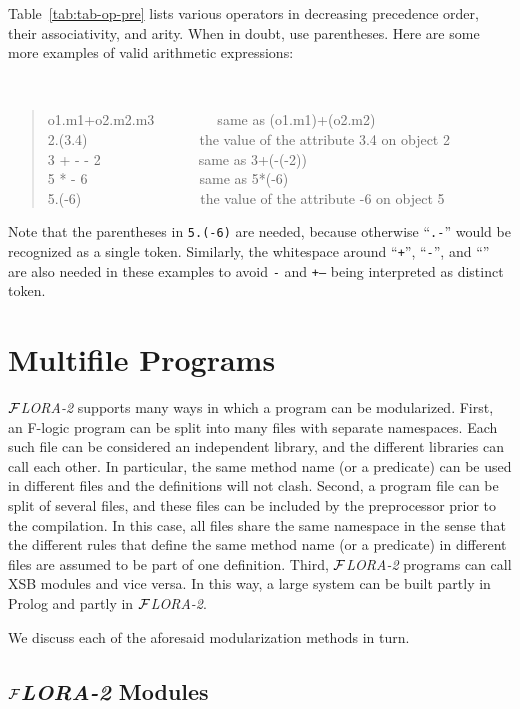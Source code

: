 \documentclass[11pt]{article}
\newcommand{\FLORA}{{\mbox{${\cal F}${\small\it LORA}\rm\emph{-2}}}\xspace}
\newcommand{\fl}{\mbox{F-logic}\xspace}
\begin{document}
Table~\ref{tab:tab-op-pre} lists various operators in decreasing precedence
order, their associativity, and arity.  When in doubt, use parentheses.
Here are some more examples of valid arithmetic expressions:
{\tt
\begin{quote}
o1.m1+o2.m2.m3~~~~~~~~~{\rm same as} (o1.m1)+(o2.m2)\\
2.(3.4)~~~~~~~~~~~~~~~~{\rm the value of the attribute} 3.4 {\rm on object} 2\\
3 + - - 2~~~~~~~~~~~~~~{\rm same as} 3+(-(-2))\\
5 * - 6~~~~~~~~~~~~~~~~{\rm same as} 5*(-6)\\
5.(-6)~~~~~~~~~~~~~~~~~{\rm the value of the attribute} -6 {\rm on object} 5
\end{quote}
}
Note that the parentheses in {\tt 5.(-6)} are needed,
because otherwise ``{\tt .-}'' would be recognized as a single token.
Similarly, the whitespace around ``{\tt +}'', ``{\tt -}'', and ``{\tt *}''
are also needed in these examples to avoid {\tt *-} and {\tt +--} being
interpreted as distinct token.


\section{Multifile Programs}

\FLORA supports many ways in which a program can be modularized.  First, an
\fl program can be split into many files with separate namespaces. Each
such file can be considered an independent library, and the different
libraries can call each other. In particular, the same method name (or a
predicate) can be used in different files and the definitions will not
clash.  Second, a program file can be split of several files, and these
files can be included by the preprocessor prior to the compilation. In this
case, all files share the same namespace in the sense that the different
rules that define the same method name (or a predicate) in different files
are assumed to be part of one definition. Third, \FLORA programs can call
XSB modules and vice versa. In this way, a large system can be built partly
in Prolog and partly in \FLORA.

We discuss each of the aforesaid modularization methods in turn.


\subsection{\FLORA Modules} \label{sec:flora-modules}
\end{document}

